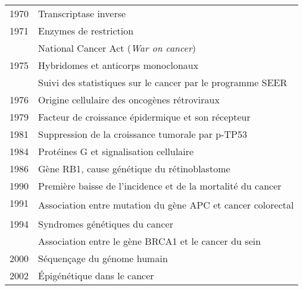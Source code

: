 \begin{table}
\begin{center}
\begin{tabular}{cl}
            1970          & Transcriptase inverse                                                                   \\
            1971          & Enzymes de restriction                                                                  \\
                          & National Cancer Act (\emph{War on cancer})                                              \\
            1975          & Hybridomes et anticorps monoclonaux                                                     \\
                          & Suivi des statistiques sur le cancer par le programme \acs{SEER}                        \\
            1976          & Origine cellulaire des oncogènes rétroviraux                                            \\
            1979          & Facteur de croissance épidermique et son récepteur                                      \\
            1981          & Suppression de la croissance tumorale par \acs{p-TP53}                                  \\
            1984          & Protéines G et signalisation cellulaire                                                 \\
            1986          & Gène \acs{RB1}, cause génétique du rétinoblastome                                       \\
            1990          & Première baisse de l'incidence et de la mortalité du cancer                             \\
            1991          & \multirow{2}{6.5cm}{Association entre mutation du gène \acs{APC} et cancer colorectal}  \\
            & \\
            1994          & Syndromes génétiques du cancer                                                          \\
                          & Association entre le gène \acs{BRCA1} et le cancer du sein\index{cancer!cancer du sein} \\
            2000          & Séquençage du génome humain                                                             \\
            2002          & Épigénétique dans le cancer                                                             \\

\end{tabular}
\end{center}
\end{table}
